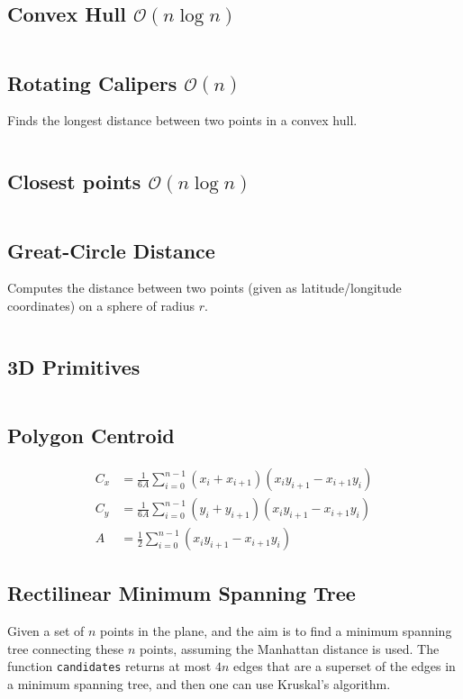 \documentclass[8pt,a4paper,landscape,oneside]{amsart}
\newcommand{\mintedstyle}[2]{\inputminted[fontsize=\normalsize,baselinestretch=.9,breaklines,tabsize=2]{#1}{code/#2}}
\newcommand{\code}[1]{\mintedstyle{cpp}{#1}}
\begin{document}
\begin{multicols*}{3}
\subsection{Convex Hull $\mathcal{O}(n \log n)$}
\code{geometry/convex_hull.cpp}

\subsection{Rotating Calipers $\mathcal{O}(n)$}
Finds the longest distance between two points in a convex hull.
\code{geometry/rotating_calipers.cpp}

\subsection{Closest points $\mathcal{O}(n \log n)$}
\code{geometry/closest_points.cpp}

\subsection{Great-Circle Distance}
Computes the distance between two points (given as latitude/longitude
coordinates) on a sphere of radius $r$.
\code{geometry/gc_distance.cpp}

\subsection{3D Primitives}
\code{geometry/primitives3d.cpp}

\subsection{Polygon Centroid}
\begin{align*}
  C_x &= \frac{1}{6A}\sum_{i=0}^{n-1}(x_i+x_{i+1})(x_iy_{i+1} - x_{i+1}y_i) \\
  C_y &= \frac{1}{6A}\sum_{i=0}^{n-1}(y_i+y_{i+1})(x_iy_{i+1} - x_{i+1}y_i) \\
  A &= \frac12\sum_{i=0}^{n-1}(x_iy_{i+1}-x_{i+1}y_i)
\end{align*}

\subsection{Rectilinear Minimum Spanning Tree}
Given a set of $n$ points in the plane, and the aim is to find a
minimum spanning tree connecting these $n$ points, assuming the
Manhattan distance is used. The function \texttt{candidates} returns at
most $4n$ edges that are a superset of the edges in a minimum spanning
tree, and then one can use Kruskal's algorithm.
\code{geometry/rmst.cpp}


\end{multicols*}
\end{document}
